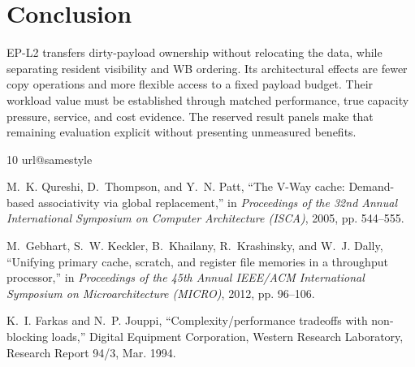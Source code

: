 \documentclass[conference,letterpaper]{IEEEtran}
\newcommand{\epl}{EP-L2}
\begin{document}
\section{Conclusion}
\epl{} transfers dirty-payload ownership without relocating the data, while separating resident visibility and WB ordering. Its architectural effects are fewer copy operations and more flexible access to a fixed payload budget. Their workload value must be established through matched performance, true capacity pressure, service, and cost evidence. The reserved result panels make that remaining evaluation explicit without presenting unmeasured benefits.

\clearpage
\begin{thebibliography}{10}
\providecommand{\url}[1]{#1}
\csname url@samestyle\endcsname
\providecommand{\newblock}{\relax}
\providecommand{\bibinfo}[2]{#2}
\providecommand{\BIBentrySTDinterwordspacing}{\spaceskip=0pt\relax}
\providecommand{\BIBentryALTinterwordstretchfactor}{4}
\providecommand{\BIBentryALTinterwordspacing}{\spaceskip=\fontdimen2\font plus
\BIBentryALTinterwordstretchfactor\fontdimen3\font minus
  \fontdimen4\font\relax}
\providecommand{\BIBforeignlanguage}[2]{{%
\expandafter\ifx\csname l@#1\endcsname\relax
\typeout{** WARNING: IEEEtran.bst: No hyphenation pattern has been}%
\typeout{** loaded for the language `#1'. Using the pattern for}%
\typeout{** the default language instead.}%
\else
\language=\csname l@#1\endcsname
\fi
#2}}
\providecommand{\BIBdecl}{\relax}
\BIBdecl

M.~K. Qureshi, D.~Thompson, and Y.~N. Patt, ``The {V-Way} cache: Demand-based
  associativity via global replacement,'' in \emph{Proceedings of the 32nd
  Annual International Symposium on Computer Architecture (ISCA)}, 2005, pp.
  544--555.

M.~Gebhart, S.~W. Keckler, B.~Khailany, R.~Krashinsky, and W.~J. Dally,
  ``Unifying primary cache, scratch, and register file memories in a throughput
  processor,'' in \emph{Proceedings of the 45th Annual IEEE/ACM International
  Symposium on Microarchitecture (MICRO)}, 2012, pp. 96--106.

K.~I. Farkas and N.~P. Jouppi, ``Complexity/performance tradeoffs with
  non-blocking loads,'' Digital Equipment Corporation, Western Research
  Laboratory, Research Report 94/3, Mar. 1994.


\end{thebibliography}
\end{document}
